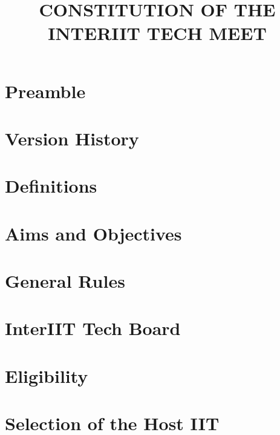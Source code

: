 \documentclass[letterpaper,12pt,titlepage]{article}
\title{\Huge{\uppercase{\textbf{Constitution of the InterIIT Tech Meet}}}}
\date{}
\begin{document}

\begin{titlepage}
\maketitle
\end{titlepage}


\thispagestyle{empty}

\tableofcontents
\clearpage

\section{Preamble}


\newpage
\section{Version History}


\newpage
\section{Definitions}


\newpage
\section{Aims and Objectives}


\newpage
\section{General Rules}


\newpage
\section{InterIIT Tech Board}


\newpage
\section{Eligibility}


\newpage
\section{Selection of the Host IIT}

\end{document}
